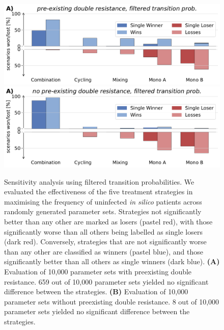 \begin{figure}[p]
  \centering

  \includegraphics[width = \linewidth]{chapter_2_sup/figures/wins_and_losses_clean_preexisting.pdf}
  \includegraphics[width = \linewidth]{chapter_2_sup/figures/wins_and_losses_clean_no_preex.pdf}
  \caption{
    Sensitivity analysis using filtered transition probabilities.
    We evaluated the effectiveness of the five treatment strategies in maximising the frequency of uninfected \textit{in silico} patients across randomly generated parameter sets.
    Strategies not significantly better than any other are marked as losers (pastel red), with those significantly worse than all others being labelled as single losers (dark red).
    Conversely, strategies that are not significantly worse than any other are classified as winners (pastel blue), and those significantly better than all others as single winners (dark blue).
    \textbf{(A)} Evaluation of 10,000 parameter sets with preexisting double resistance. 659 out of 10,000 parameter sets yielded no significant difference between the strategies.
    \textbf{(B)} Evaluation of 10,000 parameter sets without preexisting double resistance. 8 out of 10,000 parameter sets yielded no significant difference between the strategies.
  }
  \label{fig:senstivity_clean}
\end{figure}
